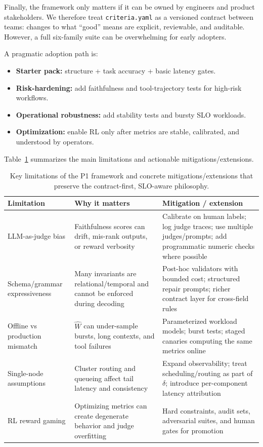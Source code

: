 Finally, the framework only matters if it can be owned by engineers and product stakeholders.
We therefore treat \texttt{criteria.yaml} as a versioned contract between teams: changes to what ``good'' means are explicit, reviewable, and auditable.
However, a full six-family suite can be overwhelming for early adopters.

A pragmatic adoption path is:
\begin{itemize}[leftmargin=12pt]
    \item \textbf{Starter pack:} structure + task accuracy + basic latency gates.
    \item \textbf{Risk-hardening:} add faithfulness and tool-trajectory tests for high-risk workflows.
    \item \textbf{Operational robustness:} add stability tests and bursty SLO workloads.
    \item \textbf{Optimization:} enable RL only after metrics are stable, calibrated, and understood by operators.
\end{itemize}

Table~\ref{tab:limitations} summarizes the main limitations and actionable mitigations/extensions.

\begin{table}[t]
\centering
\small
\begin{tabular}{p{3.2cm}p{5.0cm}p{6.8cm}}
\toprule
\textbf{Limitation} & \textbf{Why it matters} & \textbf{Mitigation / extension} \\
\midrule
LLM-as-judge bias & Faithfulness scores can drift, mis-rank outputs, or reward verbosity & Calibrate on human labels; log judge traces; use multiple judges/prompts; add programmatic numeric checks where possible \\
\addlinespace
Schema/grammar expressiveness & Many invariants are relational/temporal and cannot be enforced during decoding & Post-hoc validators with bounded cost; structured repair prompts; richer contract layer for cross-field rules \\
\addlinespace
Offline vs production mismatch & $\widehat{W}$ can under-sample bursts, long contexts, and tool failures & Parameterized workload models; burst tests; staged canaries computing the same metrics online \\
\addlinespace
Single-node assumptions & Cluster routing and queueing affect tail latency and consistency & Expand observability; treat scheduling/routing as part of $\delta$; introduce per-component latency attribution \\
\addlinespace
RL reward gaming & Optimizing metrics can create degenerate behavior and judge overfitting & Hard constraints, audit sets, adversarial suites, and human gates for promotion \\
\bottomrule
\end{tabular}
\caption{Key limitations of the P1 framework and concrete mitigations/extensions that preserve the contract-first, SLO-aware philosophy.}
\label{tab:limitations}
\end{table}

